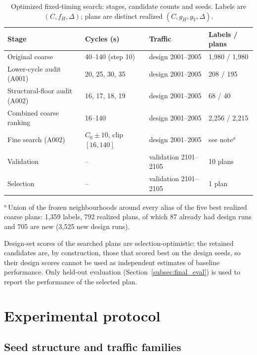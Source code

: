 \documentclass[review,12pt]{elsarticle}
\begin{document}
\begin{table}[!htbp]
\centering
\caption{Optimized fixed-timing search: stages, candidate counts and
seeds. Labels are $(C,f_H,\Delta)$; plans are distinct realized
$(C,g_H,g_V,\Delta)$.}
\label{tab:baseline_search}
\small
\begin{tabularx}{\textwidth}{@{}L{3.7cm}L{2.5cm}L{2.7cm}Y@{}}
\toprule
Stage & Cycles (s) & Traffic & Labels / plans \\
\midrule
Original coarse & 40--140 (step 10) & design 2001--2005 & 1{,}980 / 1{,}980 \\
Lower-cycle audit (A001) & 20, 25, 30, 35 & design 2001--2005 & 208 / 195 \\
Structural-floor audit (A002) & 16, 17, 18, 19 & design 2001--2005 & 68 / 40 \\
Combined coarse ranking & 16--140 & design 2001--2005 & 2{,}256 / 2{,}215 \\
Fine search (A002) & $C_0\pm10$, clip $[16,140]$ & design 2001--2005 & see note$^{a}$ \\
Validation & -- & validation 2101--2105 & 10 plans \\
Selection & -- & validation 2101--2105 & 1 plan \\
\bottomrule
\end{tabularx}
\par\smallskip\raggedright\footnotesize $^{a}$\,Union of the frozen neighbourhoods around every alias of the five best realized coarse plans: 1{,}359 labels, 792 realized plans, of which 87 already had design runs and 705 are new (3{,}525 new design runs).
\end{table}

Design-set scores of the searched plans are selection-optimistic: the
retained candidates are, by construction, those that scored best on the
design seeds, so their design scores cannot be used as independent
estimates of baseline performance. Only held-out evaluation
(Section~\ref{subsec:final_eval}) is used to report the performance of
the selected plan.

\section{Experimental protocol}
\label{sec:protocol}

\subsection{Seed structure and traffic families}
\label{subsec:seeds}
\end{document}
